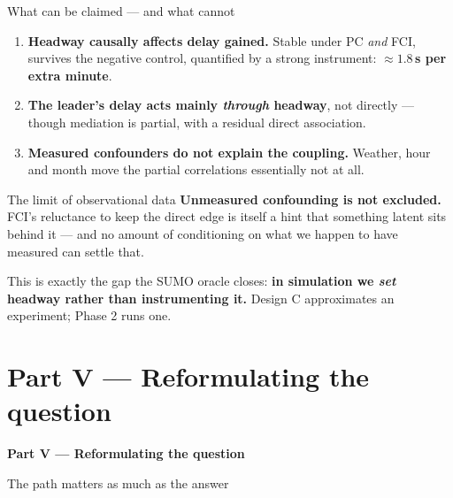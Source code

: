 \documentclass[aspectratio=169,10pt]{beamer}
\newcommand{\hl}[1]{{\color{corange}\textbf{#1}}}
\begin{document}
\begin{frame}{What can be claimed --- and what cannot}
  \begin{enumerate}
    \item \textbf{Headway causally affects delay gained.} Stable under PC \emph{and} FCI,
      survives the negative control, quantified by a strong instrument:
      \hl{$\approx1.8$\,s per extra minute}.
    \item \textbf{The leader's delay acts mainly \emph{through} headway}, not directly ---
      though mediation is partial, with a residual direct association.
    \item \textbf{Measured confounders do not explain the coupling.} Weather, hour and month
      move the partial correlations essentially not at all.
  \end{enumerate}

  \vspace{0.8em}
  \begin{alertblock}{\small The limit of observational data}
    \small \textbf{Unmeasured confounding is not excluded.} FCI's reluctance to keep the
    direct edge is itself a hint that something latent sits behind it --- and no amount of
    conditioning on what we happen to have measured can settle that.

    \vspace{0.3em}
    This is exactly the gap the SUMO oracle closes: \hl{in simulation we \emph{set} headway
    rather than instrumenting it.} Design C approximates an experiment; Phase 2 runs one.
  \end{alertblock}
\end{frame}

\section{Part V --- Reformulating the question}
\begin{frame}[plain]
  \begin{center}\Large\textbf{Part V --- Reformulating the question}\end{center}
  \begin{center}\color{ink2}The path matters as much as the answer\end{center}
\end{frame}
\end{document}
